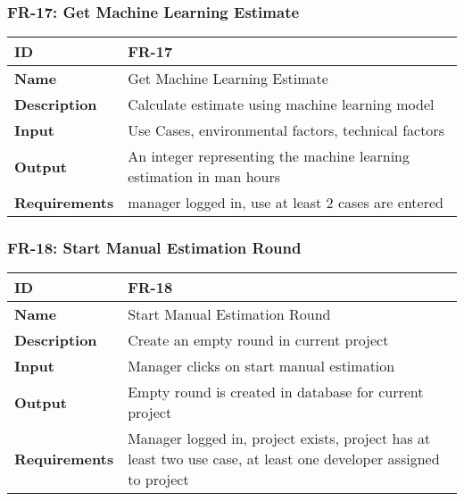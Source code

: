     \subsubsection{FR-17: Get Machine Learning Estimate}
    \begin{center}
        \begin{tabularx}{\textwidth}{|l|X|}
            \hline
            \textbf{ID} & FR-17 \\
            \hline
            \textbf{Name} & Get Machine Learning Estimate \\
            \hline
            \textbf{Description} & Calculate estimate using machine learning model \\
            \hline
            \textbf{Input} & Use Cases, environmental factors, technical factors \\
            \hline
            \textbf{Output} & An integer representing the machine learning estimation in man hours \\
            \hline
            \textbf{Requirements} & manager logged in, use at least 2 cases are entered \\
            \hline
        \end{tabularx}
    \end{center}
    
    

    \subsubsection{FR-18: Start Manual Estimation Round}
    \begin{center}
        \begin{tabularx}{\textwidth}{|l|X|}
            \hline
            \textbf{ID} & FR-18 \\
            \hline
            \textbf{Name} & Start Manual Estimation Round \\
            \hline
            \textbf{Description} & Create an empty round in current project \\
            \hline
            \textbf{Input} & Manager clicks on start manual estimation \\
            \hline
            \textbf{Output} & Empty round is created in database for current project \\
            \hline
            \textbf{Requirements} & Manager logged in, project exists, project has at least two use case, at least one developer assigned to project \\
            \hline
        \end{tabularx}
    \end{center}
    
